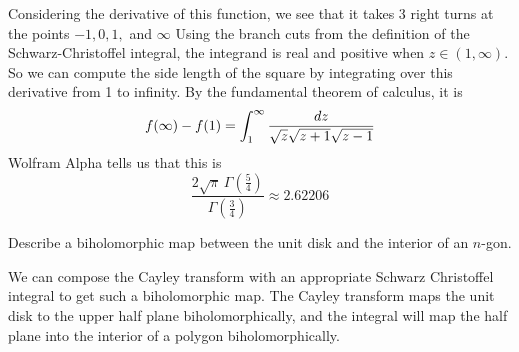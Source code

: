 \documentclass{homework}
\begin{document}
                                                                    \begin{solution}
                                                                    Considering the derivative of this function, we see that it takes 3 right turns at the points $-1, 0, 1,$ and $\infty$ Using the branch cuts from the definition of the Schwarz-Christoffel integral, the integrand is real and positive when $z\in (1, \infty)$. So we can compute the side length of the square by integrating over this derivative from 1 to infinity. By the fundamental theorem of calculus, it is 
                                                                    \[
                                                                    f(\infty) - f(1) = \int_1^\infty \frac{dz}{\sqrt{z}\sqrt{z+1}\sqrt{z-1}}
                                                                    \]
                                                                    Wolfram Alpha tells us that this is
                                                                    \[
                                                                    \frac{2\sqrt{\pi}\, \Gamma(\frac{5}{4})}{\Gamma(\frac{3}{4})} \approx 2.62206
                                                                    \]
                                                                    \end{solution}
                                                                    \begin{problem}
                                                                      Describe a biholomorphic map between the unit disk and the interior
                                                                        of an $n$-gon.
                                                                        \end{problem}
                                                                        \begin{solution}
                                                                        We can compose the Cayley transform with an appropriate Schwarz Christoffel integral to get such a biholomorphic map. The Cayley transform maps the unit disk to the upper half plane biholomorphically, and the integral will map the half plane into the interior of a polygon biholomorphically.

                                                                        \end{solution}
\end{document}
